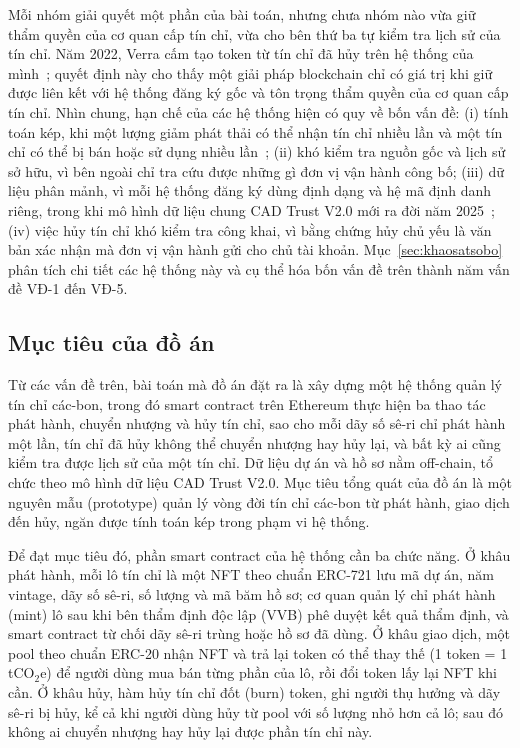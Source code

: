Mỗi nhóm giải quyết một phần của bài toán, nhưng chưa nhóm nào vừa giữ thẩm quyền của cơ quan cấp tín chỉ, vừa cho bên thứ ba tự kiểm tra lịch sử của tín chỉ. Năm 2022, Verra cấm tạo token từ tín chỉ đã hủy trên hệ thống của mình~\cite{verra2022crypto}; quyết định này cho thấy một giải pháp blockchain chỉ có giá trị khi giữ được liên kết với hệ thống đăng ký gốc và tôn trọng thẩm quyền của cơ quan cấp tín chỉ. Nhìn chung, hạn chế của các hệ thống hiện có quy về bốn vấn đề: (i) tính toán kép, khi một lượng giảm phát thải có thể nhận tín chỉ nhiều lần và một tín chỉ có thể bị bán hoặc sử dụng nhiều lần~\cite{schneider2019double}; (ii) khó kiểm tra nguồn gốc và lịch sử sở hữu, vì bên ngoài chỉ tra cứu được những gì đơn vị vận hành công bố; (iii) dữ liệu phân mảnh, vì mỗi hệ thống đăng ký dùng định dạng và hệ mã định danh riêng, trong khi mô hình dữ liệu chung CAD Trust V2.0 mới ra đời năm 2025~\cite{cadtrust2025datamodel}; (iv) việc hủy tín chỉ khó kiểm tra công khai, vì bằng chứng hủy chủ yếu là văn bản xác nhận mà đơn vị vận hành gửi cho chủ tài khoản. Mục~\ref{sec:khaosatsobo} phân tích chi tiết các hệ thống này và cụ thể hóa bốn vấn đề trên thành năm vấn đề VĐ-1 đến VĐ-5.

\subsection*{Mục tiêu của đồ án}
\label{subsec:baitoan}
\label{subsec:muctieu}

Từ các vấn đề trên, bài toán mà đồ án đặt ra là xây dựng một hệ thống quản lý tín chỉ các-bon, trong đó smart contract trên Ethereum thực hiện ba thao tác phát hành, chuyển nhượng và hủy tín chỉ, sao cho mỗi dãy số sê-ri chỉ phát hành một lần, tín chỉ đã hủy không thể chuyển nhượng hay hủy lại, và bất kỳ ai cũng kiểm tra được lịch sử của một tín chỉ. Dữ liệu dự án và hồ sơ nằm off-chain, tổ chức theo mô hình dữ liệu CAD Trust V2.0. Mục tiêu tổng quát của đồ án là một nguyên mẫu (prototype) quản lý vòng đời tín chỉ các-bon từ phát hành, giao dịch đến hủy, ngăn được tính toán kép trong phạm vi hệ thống.

Để đạt mục tiêu đó, phần smart contract của hệ thống cần ba chức năng. Ở khâu phát hành, mỗi lô tín chỉ là một NFT theo chuẩn ERC-721 lưu mã dự án, năm vintage, dãy số sê-ri, số lượng và mã băm hồ sơ; cơ quan quản lý chỉ phát hành (mint) lô sau khi bên thẩm định độc lập (VVB) phê duyệt kết quả thẩm định, và smart contract từ chối dãy sê-ri trùng hoặc hồ sơ đã dùng. Ở khâu giao dịch, một pool theo chuẩn ERC-20 nhận NFT và trả lại token có thể thay thế (1 token = 1 tCO$_2$e) để người dùng mua bán từng phần của lô, rồi đổi token lấy lại NFT khi cần. Ở khâu hủy, hàm hủy tín chỉ đốt (burn) token, ghi người thụ hưởng và dãy sê-ri bị hủy, kể cả khi người dùng hủy từ pool với số lượng nhỏ hơn cả lô; sau đó không ai chuyển nhượng hay hủy lại được phần tín chỉ này.

